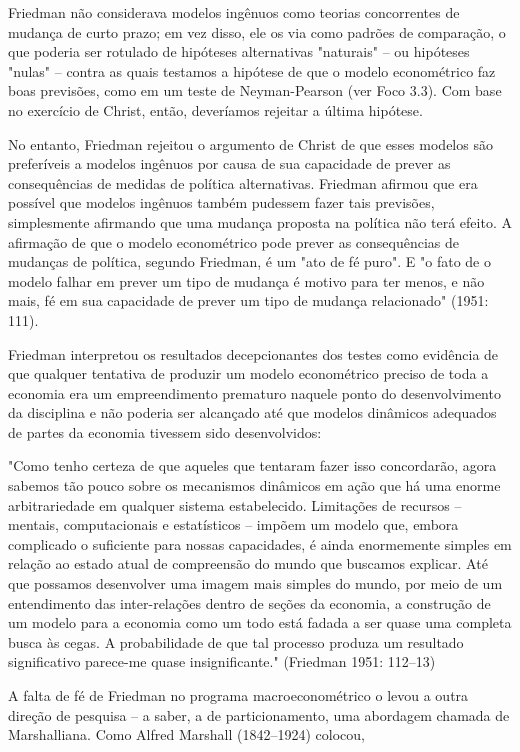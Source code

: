\documentclass[12pt]{article}
\begin{document}
Friedman não considerava modelos ingênuos como teorias concorrentes de mudança de curto prazo; em vez disso, ele os via como padrões de comparação, o que poderia ser rotulado de hipóteses alternativas "naturais" – ou hipóteses "nulas" – contra as quais testamos a hipótese de que o modelo econométrico faz boas previsões, como em um teste de Neyman-Pearson (ver Foco 3.3). Com base no exercício de Christ, então, deveríamos rejeitar a última hipótese.

No entanto, Friedman rejeitou o argumento de Christ de que esses modelos são preferíveis a modelos ingênuos por causa de sua capacidade de prever as consequências de medidas de política alternativas. Friedman afirmou que era possível que modelos ingênuos também pudessem fazer tais previsões, simplesmente afirmando que uma mudança proposta na política não terá efeito. A afirmação de que o modelo econométrico pode prever as consequências de mudanças de política, segundo Friedman, é um "ato de fé puro". E "o fato de o modelo falhar em prever um tipo de mudança é motivo para ter menos, e não mais, fé em sua capacidade de prever um tipo de mudança relacionado" (1951: 111).

Friedman interpretou os resultados decepcionantes dos testes como evidência de que qualquer tentativa de produzir um modelo econométrico preciso de toda a economia era um empreendimento prematuro naquele ponto do desenvolvimento da disciplina e não poderia ser alcançado até que modelos dinâmicos adequados de partes da economia tivessem sido desenvolvidos:

"Como tenho certeza de que aqueles que tentaram fazer isso concordarão, agora sabemos tão pouco sobre os mecanismos dinâmicos em ação que há uma enorme arbitrariedade em qualquer sistema estabelecido. Limitações de recursos – mentais, computacionais e estatísticos – impõem um modelo que, embora complicado o suficiente para nossas capacidades, é ainda enormemente simples em relação ao estado atual de compreensão do mundo que buscamos explicar. Até que possamos desenvolver uma imagem mais simples do mundo, por meio de um entendimento das inter-relações dentro de seções da economia, a construção de um modelo para a economia como um todo está fadada a ser quase uma completa busca às cegas. A probabilidade de que tal processo produza um resultado significativo parece-me quase insignificante."
(Friedman 1951: 112–13)

A falta de fé de Friedman no programa macroeconométrico o levou a outra direção de pesquisa – a saber, a de particionamento, uma abordagem chamada de Marshalliana. Como Alfred Marshall (1842–1924) colocou,
\end{document}

